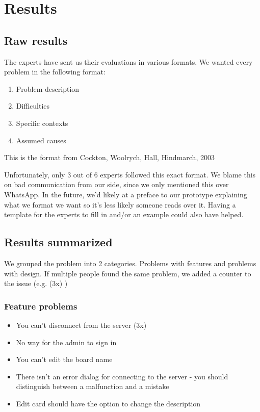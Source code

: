 \section{Results}
\subsection{Raw results}
The experts have sent us their evaluations in various formats. We wanted every problem in the following format:
\begin{enumerate}
    \item Problem description
    \item Difficulties
    \item Specific contexts
    \item Assumed causes
\end{enumerate}
This is the format from Cockton, Woolrych, Hall, Hindmarch, 2003\cite{woolrych2003changing}

Unfortunately, only 3 out of 6 experts followed this exact format. We blame this on bad communication from our side, since we only mentioned this over WhatsApp. In the future, we'd likely at a preface to our prototype explaining what we format we want so it's less likely someone reads over it. Having a template for the experts to fill in and/or an example could also have helped.


\subsection{Results summarized}
We grouped the problem into 2 categories. Problems with features and problems with design. If multiple people found the same problem, we added a counter to the issue (e.g. (3x) )

\subsubsection{Feature problems}
\begin{itemize}
    \item You can't disconnect from the server (3x)
    \item No way for the admin to sign in
    \item You can't edit the board name
    \item There isn't an error dialog for connecting to the server - you should distinguish between a malfunction and a mistake
    \item Edit card should have the option to change the description
\end{itemize}

